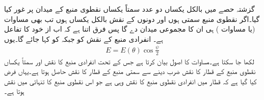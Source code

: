 گزشتہ حصے میں بالکل یکساں دو عدد سمتاً یکساں نقطوی منبع کے میدان پر غور کیا گیا۔اگر نقطوی منبع سمتی ہوں  اور دونوں کے نقش بالکل یکساں ہوں تب بھی مساوات  (یا مساوات ) ہی ان کا مجموعی میدان دے گا پس فرق اتنا ہے کہ اب  از خود  کا تفاعل  ہے۔ انفرادی منبع کے نقش  کو  جبکہ  کو   کہا جائے گا۔یوں
\begin{align}\label{مساوات_اینٹینا_ضرب_نقش}
E=E(\theta) \cos \frac{\psi}{2}
\end{align}
لکھا جا سکتا ہے۔مساوات   کا اصول بیان کرتا ہے جس کے تحت انفرادی منبع کا نقش اور سمتاً یکساں نقطوی منبع کے قطار کا نقش ضرب دینے سے سمتی منبع کے قطار کا نقش حاصل ہوتا ہے۔یہاں فرض کیا گیا ہے کہ قطار میں انفرادی نقطوی منبع کا نقش وہی ہے جو اس نقطوی منبع کا تنہائی میں نقش ہوتا ہے۔

